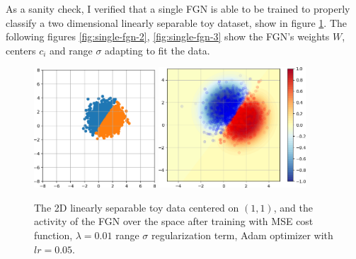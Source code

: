 \documentclass[12pt,oneside]{CUNY_PhD}
\begin{document}
As a sanity check, I verified that a single FGN is able to be trained to properly classify a two dimensional linearly separable toy dataset, show in figure \ref{fig:single-fgn-1}. The following figures \ref{fig:single-fgn-2}, \ref{fig:single-fgn-3} show the FGN's weights $W$, centers $c_i$ and range $\sigma$ adapting to fit the data.
\begin{figure}[!htbp]
    \centering
    \hspace{0.0\textwidth}
    \includegraphics[width=0.405\textwidth]{images/2D-single-neuron/2d-easy-data-cropped.png}
    \hspace{0.04\textwidth}
    \includegraphics[width=0.49\textwidth]{images/2D-single-neuron/2d-easy-trained-activity-cropped.png}
    \caption{The 2D linearly separable toy data centered on $(1,1)$, and the activity of the FGN over the space after training with MSE cost function, $\lambda=0.01$ range $\sigma$ regularization term, Adam optimizer with $lr=0.05$.}
    \label{fig:single-fgn-1}
\end{figure}
\end{document}
